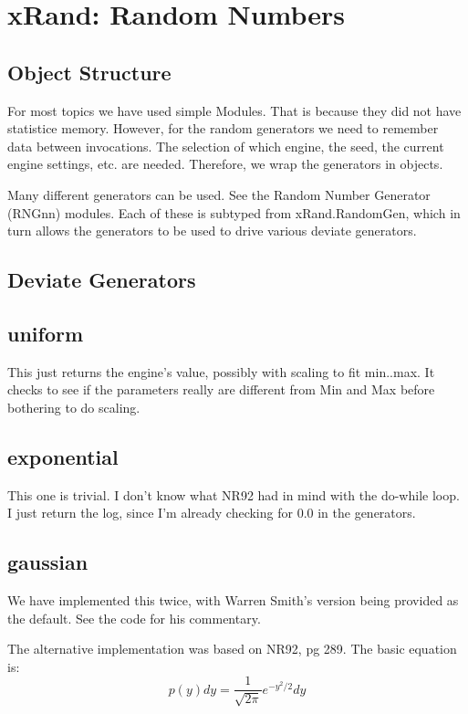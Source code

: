 \section{xRand: Random Numbers}
\subsection{Object Structure}
For most topics we have used simple Modules.  
That is because they did not have statistice memory.  However, for
the random generators we need to remember data between invocations.  The
selection of which engine, the seed, the current engine settings, etc.
are needed.  Therefore, we wrap the generators in objects.

Many different generators can be used.  See the Random Number Generator
(RNGnn) modules.  Each of these is subtyped from xRand.RandomGen, which
in turn allows the generators to be used to drive various
deviate generators.

\subsection{Deviate Generators}

\subsection*{uniform}
This just returns the engine's value, possibly with scaling to fit
min..max.  It checks to see if the parameters really are different
from Min and Max before bothering to do scaling.

\subsection*{exponential}
This one is trivial.  I don't know what NR92 had in
mind with the do-while loop.  I just return the log, since
I'm already checking for 0.0 in the generators.

\subsection*{gaussian}
We have implemented this twice, with Warren Smith's version being
provided as the default. See the code for his commentary.  

The alternative implementation was based on NR92, pg 289.
The basic equation is:
\begin{equation}
  p(y)dy = \frac{1}{\sqrt{2\pi}}e^{-y^2/2}dy
\end{equation}

